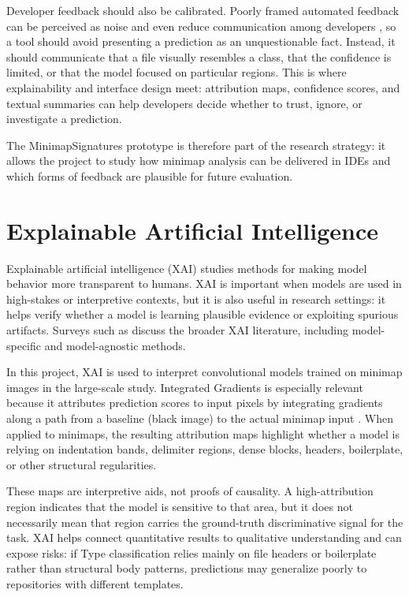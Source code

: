 Developer feedback should also be calibrated. Poorly framed automated feedback
can be perceived as noise and even reduce communication among developers
\cite{wessel2021dontdisturb}, so a tool should avoid presenting a prediction as
an unquestionable fact. Instead, it should communicate that a file visually
resembles a class, that the confidence is limited, or that the model focused on
particular regions. This is where explainability and interface design meet:
attribution maps, confidence scores, and textual summaries can help developers
decide whether to trust, ignore, or investigate a prediction.

The MinimapSignatures prototype is therefore part of the research strategy: it
allows the project to study how minimap analysis can be delivered in IDEs and
which forms of feedback are plausible for future evaluation.

\section{Explainable Artificial Intelligence}

Explainable artificial intelligence (XAI) studies methods for making model
behavior more transparent to humans. XAI is important when models are used in
high-stakes or interpretive contexts, but it is also useful in research settings:
it helps verify whether a model is learning plausible evidence or exploiting
spurious artifacts. Surveys such as  discuss the
broader XAI literature, including model-specific and model-agnostic methods.

In this project, XAI is used to interpret convolutional models trained on
minimap images in the large-scale study. Integrated Gradients is especially
relevant because it attributes prediction scores to input pixels by integrating
gradients along a path from a baseline (black image) to the actual minimap input
\cite{integratedgradients2017}. When applied to minimaps, the resulting
attribution maps highlight whether a model is relying on indentation bands,
delimiter regions, dense blocks, headers, boilerplate, or other structural
regularities.

These maps are interpretive aids, not proofs of causality. A high-attribution
region indicates that the model is sensitive to that area, but it does not
necessarily mean that region carries the ground-truth discriminative signal for
the task. XAI helps connect quantitative results to qualitative understanding
and can expose risks: if Type classification relies mainly on file headers or
boilerplate rather than structural body patterns, predictions may generalize
poorly to repositories with different templates.

